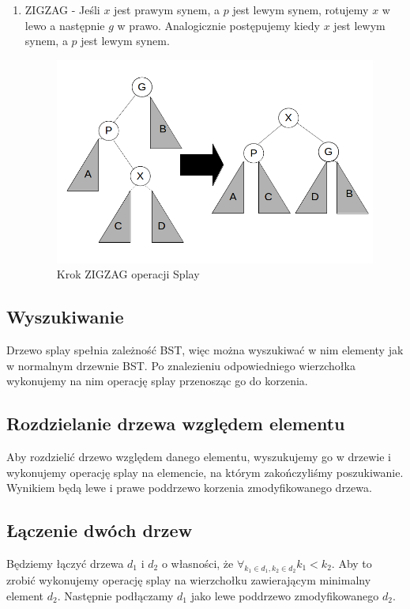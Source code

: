 \documentclass[declaration,shortabstract]{iithesis}
\theoremstyle{thm}
\theoremstyle{remark}
\theoremstyle{plain}
\theoremstyle{plain}
\theoremstyle{plain}
\begin{document}
\begin{enumerate}
\item{ZIGZAG - Jeśli $x$ jest prawym synem, a $p$ jest lewym synem, rotujemy $x$ w lewo a następnie $g$ w prawo. Analogicznie postępujemy kiedy $x$  jest lewym synem, a $p$ jest lewym synem.\\ 
\begin{figure}[H] 
\centering    
\includegraphics[scale = 0.3]{zigzag.png}  
\caption{Krok ZIGZAG operacji Splay}  
\label{fig:zigzag} 
\end{figure}} 
\end{enumerate}    

\subsection{Wyszukiwanie}
Drzewo splay spełnia zależność BST, więc można wyszukiwać w nim elementy jak w normalnym drzewnie BST. Po znalezieniu odpowiedniego wierzchołka wykonujemy na nim operację splay przenosząc go do korzenia.  

\subsection{Rozdzielanie drzewa względem elementu} 
Aby rozdzielić drzewo względem danego elementu, wyszukujemy go w drzewie i wykonujemy operację splay na elemencie, na którym zakończyliśmy poszukiwanie. Wynikiem będą lewe i prawe poddrzewo korzenia zmodyfikowanego drzewa.  

\subsection{Łączenie dwóch drzew} 
Będziemy łączyć drzewa \(d_1\) i \( d_2\) o własności, że \(\forall_{k_1 \in d_1, k_2 \in d_2} k_1 < k_2\). Aby to zrobić wykonujemy operację splay na wierzchołku zawierającym minimalny element \(d_2\). Następnie podłączamy \(d_1\) jako lewe poddrzewo zmodyfikowanego \(d_2\).  
\end{document}
